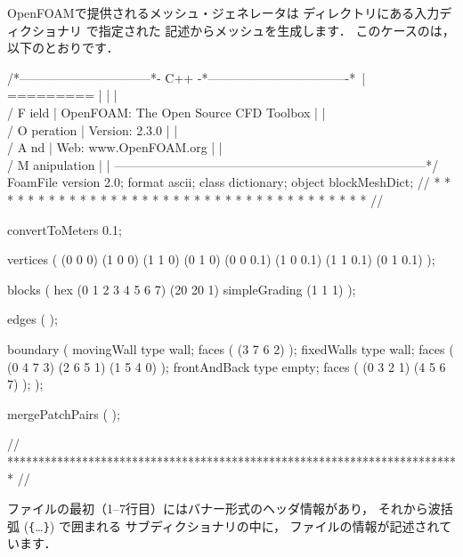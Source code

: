 OpenFOAMで提供されるメッシュ・ジェネレータは
ディレクトリにある入力ディクショナリ
%
%
で指定された
記述からメッシュを生成します．
このケースのは，以下のとおりです．
\begin{OFverbatim}
/*--------------------------------*- C++ -*----------------------------------*\
| =========                 |                                                 |
| \\      /  F ield         | OpenFOAM: The Open Source CFD Toolbox           |
|  \\    /   O peration     | Version:  2.3.0                                 |
|   \\  /    A nd           | Web:      www.OpenFOAM.org                      |
|    \\/     M anipulation  |                                                 |
\*---------------------------------------------------------------------------*/
FoamFile
{
    version     2.0;
    format      ascii;
    class       dictionary;
    object      blockMeshDict;
}
// * * * * * * * * * * * * * * * * * * * * * * * * * * * * * * * * * * * * * //

convertToMeters 0.1;

vertices        
(
    (0 0 0)
    (1 0 0)
    (1 1 0)
    (0 1 0)
    (0 0 0.1)
    (1 0 0.1)
    (1 1 0.1)
    (0 1 0.1)
);

blocks          
(
    hex (0 1 2 3 4 5 6 7) (20 20 1) simpleGrading (1 1 1)
);

edges           
(
);

boundary
(
    movingWall 
    {
        type wall;
        faces
        (
            (3 7 6 2)
        );
    }
    fixedWalls 
    {
        type wall;
        faces
        (
            (0 4 7 3)
            (2 6 5 1)
            (1 5 4 0)
        );
    }
    frontAndBack 
    {
        type empty;
        faces
        (
            (0 3 2 1)
            (4 5 6 7)
        );
    }
);

mergePatchPairs 
(
);

// ************************************************************************* //
\end{OFverbatim}
ファイルの最初（1--7行目）にはバナー形式のヘッダ情報があり，
それから波括弧 (\verb|{|\ldots\verb|}|) で囲まれる
サブディクショナリの中に，
ファイルの情報が記述されています．

